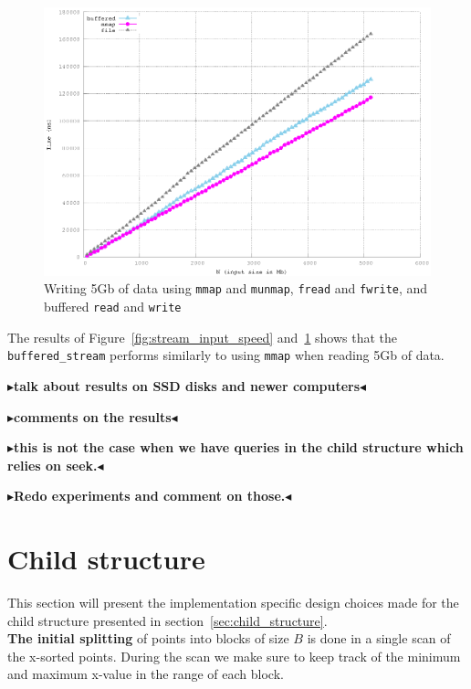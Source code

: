 \documentclass[twoside,11pt,openright]{report}
\newcommand{\todo}[1]{{\color[rgb]{.5,0,0}\textbf{$\blacktriangleright$#1$\blacktriangleleft$}}}
\begin{document}
\begin{figure}
  \centering
  \includegraphics[width=\linewidth]{../src/experiments/stream_output_speed_experiment_results/2016-04-23.16_07_40/timems}
  \caption{Writing 5Gb of data using \texttt{mmap} and \texttt{munmap}, \texttt{fread} and \texttt{fwrite}, and buffered \texttt{read} and \texttt{write}}
  \label{fig:stream_output_speed}
\end{figure}

The results of Figure~\ref{fig:stream_input_speed} and~\ref{fig:stream_output_speed} shows that the \texttt{buffered\_stream} performs similarly to using \texttt{mmap} when reading 5Gb of data.

\todo{talk about results on SSD disks and newer computers}

\todo{comments on the results}

\todo{this is not the case when we have queries in the child structure which relies on seek.}

\todo{Redo experiments and comment on those.}

\section{Child structure}
This section will present the implementation specific design choices made for the child structure presented in section~\ref{sec:child_structure}. \\

\textbf{The initial splitting} of points into blocks of size $B$ is done in a single scan of the x-sorted points. During the scan we make sure to keep track of the minimum and maximum x-value in the range of each block.
\end{document}
